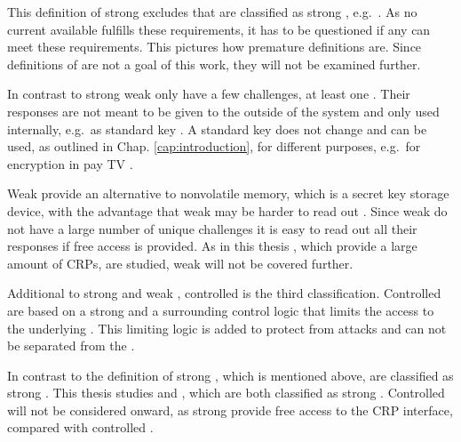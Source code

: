 This definition of strong \pufs excludes \pufs that are classified as strong \puf, e.g.\ \xpufs \cite{Becker2015ThePUFs}.
As no current available \puf fulfills these requirements, it has to be questioned if any \puf can meet these requirements.
This pictures how premature \puf definitions are.
Since definitions of \pufs are not a goal of this work, they will not be examined further.

In contrast to strong \pufs weak \pufs only have a few challenges, at least one \cite{Ruhrmair2014PUFsGlance}.
Their responses are not meant to be given to the outside of the system and only used internally, e.g.\ as standard key \cite{Ruhrmair2012AnPUFs}. %
A standard key does not change and can be used, as outlined in Chap. \ref{cap:introduction}, for different purposes, e.g.\ for encryption in pay TV \cite{Wikipedia2016PirateDecryption}. %

Weak \pufs provide an alternative to nonvolatile memory, which is a secret key storage device, with the advantage that weak \pufs may be harder to read out \cite{Lim2005ExtractingCircuits}.
Since weak \pufs do not have a large number of unique challenges it is easy to read out all their responses if free access is provided.
As in this thesis \pufs, which provide a large amount of \acp{CRP}, are studied, weak \pufs will not be covered further.

Additional to strong \puf and weak \puf, controlled \pufs is the third classification.
Controlled \pufs are based on a strong \pufs and a surrounding control logic that limits the access to the underlying \puf.
This limiting logic is added to protect \pufs from attacks and can not be separated from the \puf \cite{Ruhrmair2013PUFData,Gassend2007ControlledFunctions}. %

In contrast to the definition of strong \pufs, which is mentioned above, \apufs are classified as strong \puf \cite{Ruhrmair2010StrongProofs}.
This thesis studies \apufs and \xpufs, which are both classified as strong \puf.  
Controlled \pufs will not be considered onward, as strong \pufs provide free access to the \ac{CRP} interface, compared with controlled \pufs. %

